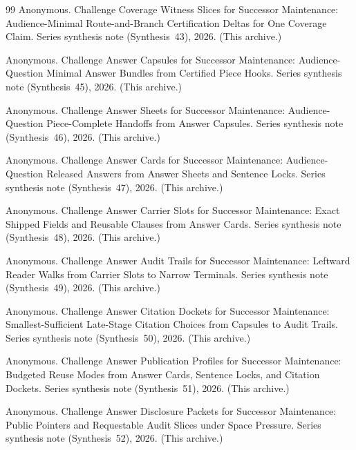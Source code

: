 \documentclass[11pt]{article}
\begin{document}
\begin{thebibliography}{99}
Anonymous.
\newblock Challenge Coverage Witness Slices for Successor Maintenance: Audience-Minimal Route-and-Branch Certification Deltas for One Coverage Claim.
\newblock Series synthesis note (Synthesis~43), 2026. (This archive.)

Anonymous.
\newblock Challenge Answer Capsules for Successor Maintenance: Audience-Question Minimal Answer Bundles from Certified Piece Hooks.
\newblock Series synthesis note (Synthesis~45), 2026. (This archive.)

Anonymous.
\newblock Challenge Answer Sheets for Successor Maintenance: Audience-Question Piece-Complete Handoffs from Answer Capsules.
\newblock Series synthesis note (Synthesis~46), 2026. (This archive.)

Anonymous.
\newblock Challenge Answer Cards for Successor Maintenance: Audience-Question Released Answers from Answer Sheets and Sentence Locks.
\newblock Series synthesis note (Synthesis~47), 2026. (This archive.)

Anonymous.
\newblock Challenge Answer Carrier Slots for Successor Maintenance: Exact Shipped Fields and Reusable Clauses from Answer Cards.
\newblock Series synthesis note (Synthesis~48), 2026. (This archive.)

Anonymous.
\newblock Challenge Answer Audit Trails for Successor Maintenance: Leftward Reader Walks from Carrier Slots to Narrow Terminals.
\newblock Series synthesis note (Synthesis~49), 2026. (This archive.)

Anonymous.
\newblock Challenge Answer Citation Dockets for Successor Maintenance: Smallest-Sufficient Late-Stage Citation Choices from Capsules to Audit Trails.
\newblock Series synthesis note (Synthesis~50), 2026. (This archive.)

Anonymous.
\newblock Challenge Answer Publication Profiles for Successor Maintenance: Budgeted Reuse Modes from Answer Cards, Sentence Locks, and Citation Dockets.
\newblock Series synthesis note (Synthesis~51), 2026. (This archive.)

Anonymous.
\newblock Challenge Answer Disclosure Packets for Successor Maintenance: Public Pointers and Requestable Audit Slices under Space Pressure.
\newblock Series synthesis note (Synthesis~52), 2026. (This archive.)


\end{thebibliography}
\end{document}
